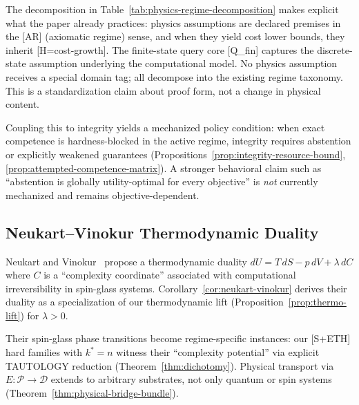 The decomposition in Table~\ref{tab:physics-regime-decomposition} makes explicit what the paper already practices: physics assumptions are declared premises in the [AR] (axiomatic regime) sense, and when they yield cost lower bounds, they inherit [H=cost-growth]. The finite-state query core [Q\_fin] captures the discrete-state assumption underlying the computational model. No physics assumption receives a special domain tag; all decompose into the existing regime taxonomy. This is a standardization claim about proof form, not a change in physical content.

Coupling this to integrity yields a mechanized policy condition: when exact competence is hardness-blocked in the active regime, integrity requires abstention or explicitly weakened guarantees (Propositions~\ref{prop:integrity-resource-bound}, \ref{prop:attempted-competence-matrix}). A stronger behavioral claim such as ``abstention is globally utility-optimal for every objective'' is \emph{not} currently mechanized and remains objective-dependent.

\subsection{Neukart--Vinokur Thermodynamic Duality}

Neukart and Vinokur~\cite{neukart2025thermodynamic} propose a thermodynamic duality $dU = T\,dS - p\,dV + \lambda\,dC$ where $C$ is a ``complexity coordinate'' associated with computational irreversibility in spin-glass systems. Corollary~\ref{cor:neukart-vinokur} derives their duality as a specialization of our thermodynamic lift (Proposition~\ref{prop:thermo-lift}) for $\lambda > 0$.

Their spin-glass phase transitions become regime-specific instances: our [S+ETH] hard families with $k^* = n$ witness their ``complexity potential'' via explicit TAUTOLOGY reduction (Theorem~\ref{thm:dichotomy}). Physical transport via $E:\mathcal{P}\to\mathcal{D}$ extends to arbitrary substrates, not only quantum or spin systems (Theorem~\ref{thm:physical-bridge-bundle}).

